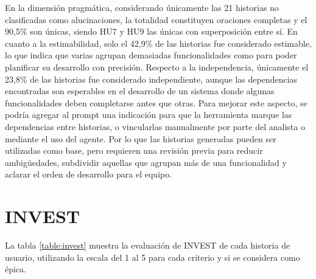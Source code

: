 En la dimensión pragmática, considerando únicamente las 21 historias no clasificadas como alucinaciones, la totalidad constituyen oraciones completas y el 90,5\% son únicas, siendo HU7 y HU9 las únicas con superposición entre sí. En cuanto a la estimabilidad, solo el 42,9\% de las historias fue considerado estimable, lo que indica que varias agrupan demasiadas funcionalidades como para poder planificar su desarrollo con precisión. Respecto a la independencia, únicamente el 23,8\% de las historias fue considerado independiente, aunque las dependencias encontradas son esperables en el desarrollo de un sistema donde algunas funcionalidades deben completarse antes que otras. Para mejorar este aspecto, se podría agregar al prompt una indicación para que la herramienta marque las dependencias entre historias, o vincularlas manualmente por parte del analista o mediante el uso del agente. Por lo que las historias generadas pueden ser utilizadas como base, pero requieren una revisión previa para reducir ambigüedades, subdividir aquellas que agrupan más de una funcionalidad y aclarar el orden de desarrollo para el equipo.

\section{INVEST}

La tabla \ref{table:invest} muestra la evaluación de INVEST de cada historia de usuario, utilizando la escala del 1 al 5 para cada criterio y si se considera como épica.

